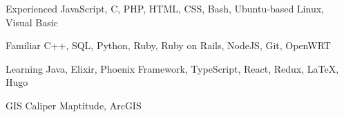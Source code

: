 

\begin{cvskills}

  \cvskill
    {Experienced} %
    {JavaScript, C, PHP, HTML, CSS, Bash, Ubuntu-based Linux, Visual Basic} %

  \cvskill
    {Familiar} %
    {C++, SQL, Python, Ruby, Ruby on Rails, NodeJS, Git, OpenWRT} %
    
  \cvskill
    {Learning} %
    {Java, Elixir, Phoenix Framework, TypeScript, React, Redux, \LaTeX, Hugo} %
    
  \cvskill
    {GIS} %
    {Caliper Maptitude, ArcGIS} %


\end{cvskills}
